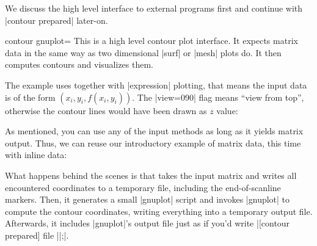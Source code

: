 {{We discuss the high level interface to external programs first and continue
with |contour prepared| later-on.

\begin{plottype}[/pgfplots]{
    contour gnuplot=\textcolor{black}{}%
}
    This is a high level contour plot interface. It expects matrix data in the
    same way as two dimensional |surf| or |mesh| plots do. It then computes
    contours and visualizes them.
\pgfplotsexpensiveexample
\begin{codeexample}[]
\end{codeexample}
    \noindent The example uses  together with
    |expression| plotting, that means the input data is of the form
    $(x_i,y_i,f(x_i,y_i))$. The |view={0}{90}| flag means ``view from top'',
    otherwise the contour lines would have been drawn as $z$ value:
%
\pgfplotsexpensiveexample
\begin{codeexample}[]
\end{codeexample}

    As mentioned, you can use any of the \PGFPlots{} input methods as long as it
    yields matrix output. Thus, we can reuse our introductory example of matrix
    data, this time with inline data:
\pgfplotsexpensiveexample
\begin{codeexample}[]
\end{codeexample}
    \noindent What happens behind the scenes is that \PGFPlots{} takes the
    input matrix and writes all encountered coordinates to a temporary file,
    including the end-of-scanline markers. Then, it generates a small |gnuplot|
    script and invokes |gnuplot| to compute the contour coordinates, writing
    everything into a temporary output file. Afterwards, it includes
    |gnuplot|'s output file just as if you'd write
    |[contour prepared] file ||;|.


\end{plottype}}}
